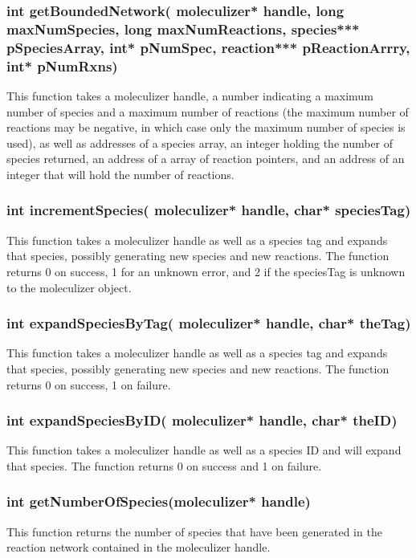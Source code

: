 \subsubsection{int getBoundedNetwork( moleculizer* handle, long
  maxNumSpecies, long maxNumReactions, species*** pSpeciesArray, int*
  pNumSpec, reaction*** pReactionArrry, int* pNumRxns)}
This function takes a moleculizer handle, a number indicating a
maximum number of species and a maximum number of reactions (the
maximum number of reactions may be negative, in which case only the
maximum number of species is used), as well as addresses of a species
array, an integer holding the number of species returned, an address
of a array of reaction pointers, and an address of an integer that
will hold the number of reactions.  

\subsubsection{int incrementSpecies( moleculizer* handle, char*
  speciesTag)}
This function takes a moleculizer handle as well as a species tag and
expands that species, possibly generating new species and new
reactions.  The function returns 0 on success, 1 for an unknown error,
and 2 if the speciesTag is unknown to the moleculizer object.

\subsubsection{int expandSpeciesByTag( moleculizer* handle, char*
  theTag)}
This function takes a moleculizer handle as well as a species tag and
expands that species, possibly generating new species and new
reactions.  The function returns 0 on success, 1 on failure.

\subsubsection{int expandSpeciesByID( moleculizer* handle, char*
  theID)}
This function takes a moleculizer handle as well as a species ID and
will expand that species.  The function returns 0 on success and 1 on failure.

\subsubsection{int getNumberOfSpecies(moleculizer* handle)}
This function returns the number of species that have been generated
in the reaction network contained in the moleculizer handle.  


